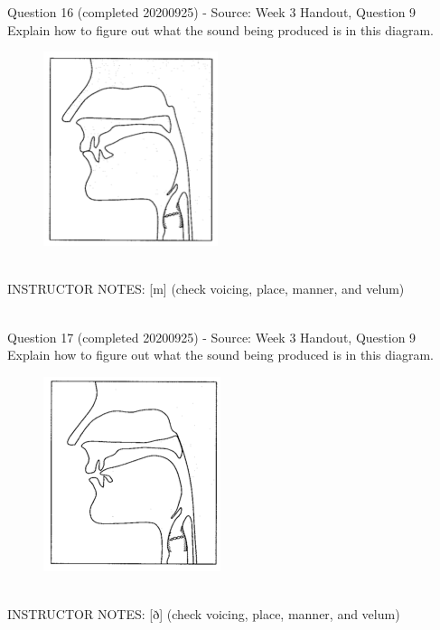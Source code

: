 \documentclass[12pt]{article}
\begin{document}
{\large Question 16} (completed 20200925) - Source: Week 3 Handout, Question 9\\

Explain how to figure out what the sound being produced is in this diagram.\\

\begin{figure}[H]
\includegraphics{../images/sagittal_m.png}
\end{figure}

~\\
INSTRUCTOR NOTES: [m] (check voicing, place, manner, and velum)


~\\

{\large Question 17} (completed 20200925) - Source: Week 3 Handout, Question 9\\

Explain how to figure out what the sound being produced is in this diagram.\\

\begin{figure}[H]
\includegraphics{../images/sagittal_eth.png}
\end{figure}

~\\
INSTRUCTOR NOTES: [ð] (check voicing, place, manner, and velum)


~\\
\end{document}
